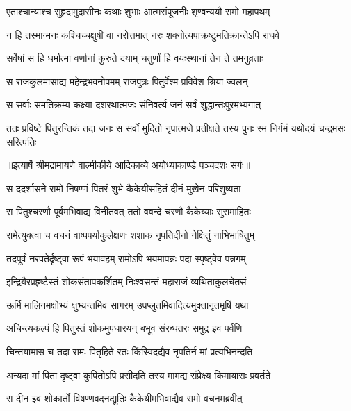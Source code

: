 \twolineshloka
{एताश्चान्याश्च सुहृदामुदासीनः कथाः शुभाः}
{आत्मसंपूजनीः शृण्वन्ययौ रामो महापथम्} %

\twolineshloka
{न हि तस्मान्मनः कश्चिच्चक्षुषी वा नरोत्तमात्}
{नरः शक्नोत्यपाक्रष्टुमतिक्रान्तेऽपि राघवे} %

\twolineshloka
{सर्वेषां स हि धर्मात्मा वर्णानां कुरुते दयाम्}
{चतुर्णां हि वयःस्थानां तेन ते तमनुव्रताः} %

\twolineshloka
{स राजकुलमासाद्य महेन्द्रभवनोपमम्}
{राजपुत्रः पितुर्वेश्म प्रविवेश श्रिया ज्वलन्} %

\twolineshloka
{स सर्वाः समतिक्रम्य कक्ष्या दशरथात्मजः}
{संनिवर्त्य जनं सर्वं शुद्धान्तःपुरमभ्यगात्} %

\fourlineindentedshloka
{ततः प्रविष्टे पितुरन्तिकं तदा}
{ जनः स सर्वो मुदितो नृपात्मजे}
{प्रतीक्षते तस्य पुनः स्म निर्गमं}
{ यथोदयं चन्द्रमसः सरित्पतिः} %


{॥इत्यार्षे श्रीमद्रामायणे वाल्मीकीये आदिकाव्ये अयोध्याकाण्डे पञ्चदशः सर्गः॥}


\twolineshloka
{स ददर्शासने रामो निषण्णं पितरं शुभे}
{कैकेयीसहितं दीनं मुखेन परिशुष्यता} %

\twolineshloka
{स पितुश्चरणौ पूर्वमभिवाद्य विनीतवत्}
{ततो ववन्दे चरणौ कैकेय्याः सुसमाहितः} %

\twolineshloka
{रामेत्युक्त्वा च वचनं वाष्पपर्याकुलेक्षणः}
{शशाक नृपतिर्दीनो नेक्षितुं नाभिभाषितुम्} %

\twolineshloka
{तदपूर्वं नरपतेर्दृष्ट्वा रूपं भयावहम्}
{रामोऽपि भयमापन्नः पदा स्पृष्ट्वेव पन्नगम्} %

\twolineshloka
{इन्द्रियैरप्रहृष्टैस्तं शोकसंतापकर्शितम्}
{निःश्वसन्तं महाराजं व्यथिताकुलचेतसं} %

\twolineshloka
{ऊर्मि मालिनमक्षोभ्यं क्षुभ्यन्तमिव सागरम्}
{उपप्लुतमिवादित्यमुक्तानृतमृषिं यथा} %

\twolineshloka
{अचिन्त्यकल्पं हि पितुस्तं शोकमुपधारयन्}
{बभूव संरब्धतरः समुद्र इव पर्वणि} %

\twolineshloka
{चिन्तयामास च तदा रामः पितृहिते रतः}
{किंस्विदद्यैव नृपतिर्न मां प्रत्यभिनन्दति} %

\twolineshloka
{अन्यदा मां पिता दृष्ट्वा कुपितोऽपि प्रसीदति}
{तस्य मामद्य संप्रेक्ष्य किमायासः प्रवर्तते} %

\twolineshloka
{स दीन इव शोकार्तो विषण्णवदनद्युतिः}
{कैकेयीमभिवाद्यैव रामो वचनमब्रवीत्} %

